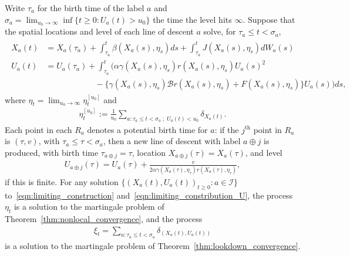 \documentclass[EJP]{ejpecp} %
\newcommand{\DG}{\mathcal{B}}  %
\newcommand{\lp}{\xi}              %
\newcommand{\labelspace}{\mathcal{I}} %
\newcommand{\concat}{\oplus}   %
\begin{document}
\begin{proposition}
Write $\tau_a$ for the birth time of the label $a$ and 
$\sigma_a = \lim_{u_0 \to \infty} \inf\{t \ge 0: U_a(t) > u_0\}$
the time the level hits $\infty$.
Suppose that the spatial locations and level of each line of descent $a$
solve, for $\tau_a \le t < \sigma_a$,
\begin{align}
    \label{eqn:limiting_construction}
    \begin{split}
X_a(t)
    &=
    X_a(\tau_a)
    + \int_{\tau_a}^{t}
        \beta(X_a(s), \eta_s) ds
    + \int_{\tau_a}^{t}
        J(X_a(s),\eta_s) dW_a(s)
    \\
U_a(t)
    &=
    U_a(\tau_a)
    + \int_{\tau_a}^{t}
    \bigg(
        \alpha \gamma(X_a(s),\eta_s)
        r(X_a(s), \eta_s) U_a(s)^2
\\ &\qquad \qquad \qquad {}   
        -
        \big\{
            \gamma(X_a(s),\eta_s) \DG r(X_a(s),\eta_s)
            + F(X_a(s), \eta_s)
        \big\}
        U_a(s)
    \bigg)
    ds ,
    \end{split}
\end{align}
where $\eta_t = \lim_{u_0 \to \infty} \eta_t^{[u_0]}$ and
\begin{align*}
    \eta_t^{[u_0]}
    :=
    \frac{1}{u_0}
        \sum_{a : \tau_a \le t < \sigma_a \; ; \; U_a(t) < u_0} \delta_{X_a(t)} .
\end{align*}
Each point in each $R_a$ denotes a potential birth time for $a$:
if the $j^\text{th}$ point in $R_a$ is $(\tau, v)$, with 
$\tau_a \le \tau < \sigma_a$,
then a new line of descent with label $a \concat j$ is produced,
with birth time $\tau_{a \concat j} = \tau$,
    location $X_{a \concat j}(\tau) = X_a(\tau)$, and level
\begin{align} \label{eqn:limiting_constribution_U}
    U_{a \concat j}(\tau) = U_a(\tau)
    + \frac{v}{ 2 \alpha \gamma(X_a(\tau), \eta_\tau) r(X_a(\tau), \eta_\tau) } ,
\end{align}
if this is finite.
For any solution $\{(X_a(t), U_a(t))_{t \ge 0}: a \in \labelspace \}$  
to~\eqref{eqn:limiting_construction} and~\eqref{eqn:limiting_constribution_U},
the process $\eta_t$
is a solution to the martingale problem of Theorem~\ref{thm:nonlocal_convergence},
and the process
\begin{align} \label{eqn:lp_defn_XU}
    \lp_t = \sum_{a : \tau_a \le t < \sigma_a} \delta_{(X_a(t), U_a(t))} 
\end{align}
is a solution to the martingale problem of
Theorem~\ref{thm:lookdown_convergence}.
\end{proposition}
\end{document}
